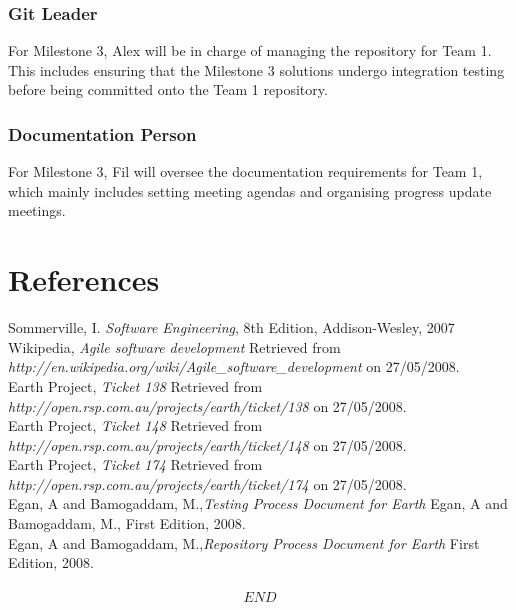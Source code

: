 \documentclass[10pt,a4,oneside]{article}
\begin{document}
\subsubsection{Git Leader}

For Milestone 3, Alex will be in charge of managing the repository for Team 1. This includes ensuring that the Milestone 3 solutions undergo integration testing before being committed onto the Team 1 repository.


\subsubsection{Documentation Person}

For Milestone 3, Fil will oversee the documentation requirements for Team 1, which mainly includes setting meeting agendas and organising progress update meetings.

\newpage

\section{References}
 
Sommerville, I. \textit{Software Engineering}, 8th Edition,  Addison-Wesley, 2007\\
\newline
Wikipedia, \textit{Agile software development} Retrieved from \emph{http://en.wikipedia.org/wiki/Agile\_software\_development} on 27/05/2008.\\
\newline
Earth Project, \textit{Ticket 138} Retrieved from \emph{http://open.rsp.com.au/projects/earth/ticket/138} on 27/05/2008.\\
\newline
Earth Project, \textit{Ticket 148} Retrieved from \emph{http://open.rsp.com.au/projects/earth/ticket/148} on 27/05/2008.\\
\newline
Earth Project, \textit{Ticket 174} Retrieved from \emph{http://open.rsp.com.au/projects/earth/ticket/174} on 27/05/2008.\\
\newline
Egan, A and Bamogaddam, M.,\textit{Testing Process Document for Earth} Egan, A and Bamogaddam, M., First Edition, 2008.\\
\newline
Egan, A and Bamogaddam, M.,\textit{Repository Process Document for Earth}  First Edition, 2008.\\

\paragraph{}

\[ END\]
\end{document}
